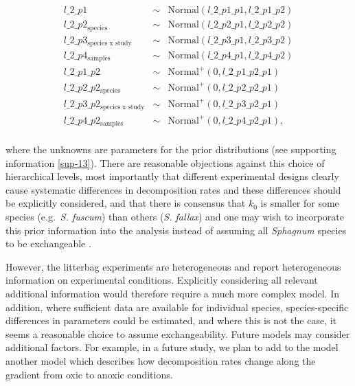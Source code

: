 \documentclass[bg, manuscript]{copernicus}
\begin{document}
\begin{equation}
\begin{aligned}
l\_2\_p1 & \sim & \text{Normal}(l\_2\_p1\_p1, l\_2\_p1\_p2)\\
l\_2\_p2_{\text{species}} & \sim & \text{Normal}(l\_2\_p2\_p1, l\_2\_p2\_p2)\\
l\_2\_p3_{\text{species x study}} & \sim & \text{Normal}(l\_2\_p3\_p1, l\_2\_p3\_p2)\\
l\_2\_p4_{\text{samples}} & \sim & \text{Normal}(l\_2\_p4\_p1, l\_2\_p4\_p2)\\
l\_2\_p1\_p2 & \sim & \text{Normal}^+(0, l\_2\_p1\_p2\_p1)\\
l\_2\_p2\_p2_{\text{species}} & \sim & \text{Normal}^+(0, l\_2\_p2\_p2\_p1)\\
l\_2\_p3\_p2_{\text{species x study}} & \sim & \text{Normal}^+(0, l\_2\_p3\_p2\_p1)\\
l\_2\_p4\_p2_{\text{samples}} & \sim & \text{Normal}^+(0, l\_2\_p4\_p2\_p1),\\
\label{eq:leaching-hierarchical-model-l0-2}
\end{aligned}
\end{equation}

where the unknowns are parameters for the prior distributions (see supporting information \ref{sup-13}). There are reasonable objections against this choice of hierarchical levels, most importantly that different experimental designs clearly cause systematic differences in decomposition rates and these differences should be explicitly considered, and that there is consensus that \(k_0\) is smaller for some species (e.g.~\emph{S. fuscum}) than others (\emph{S. fallax}) and one may wish to incorporate this prior information into the analysis instead of assuming all \emph{Sphagnum} species to be exchangeable \citep{Gelman.2014}.

However, the litterbag experiments are heterogeneous and report heterogeneous information on experimental conditions. Explicitly considering all relevant additional information would therefore require a much more complex model. In addition, where sufficient data are available for individual species, species-specific differences in parameters could be estimated, and where this is not the case, it seems a reasonable choice to assume exchangeability. Future models may consider additional factors. For example, in a future study, we plan to add to the model another model which describes how decomposition rates change along the gradient from oxic to anoxic conditions.
\end{document}
